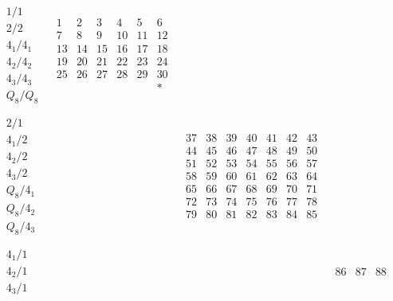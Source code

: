 \documentclass[11pt,a4paper]{amsart}
\begin{document}
\begin{align*}
  \begin{array}{r||c|c|c|c|c}
    \begin{array}{r}
      1/1 \\
      2/2 \\
      4_1/4_1 \\
      4_2/4_2 \\
      4_3/4_3 \\
      Q_8/Q_8 \\
    \end{array}
&
  \begin{array}{cccccc}
1&2&3&4&5&6\\
7&8&9&10&11&12\\
13&14&15&16&17&18\\
19&20&21&22&23&24\\
25&26&27&28&29&30\\
&&&&&*\\
  \end{array}
&&&& \\ \hline
    \begin{array}{r}
      2/1 \\
      4_1/2 \\
      4_2/2 \\
      4_3/2 \\
      Q_8/4_1 \\
      Q_8/4_2 \\
      Q_8/4_3 \\
    \end{array}
&&
   \begin{array}{cccccccc}
37&38&39&40&41&42&43\\
44&45&46&47&48&49&50\\
51&52&53&54&55&56&57\\
58&59&60&61&62&63&64\\
65&66&67&68&69&70&71\\
72&73&74&75&76&77&78\\
79&80&81&82&83&84&85\\
   \end{array}
&&& \\ \hline
    \begin{array}{r}
      4_1/1 \\
      4_2/1 \\
      4_3/1 \\
    \end{array}
&&&
    \begin{array}{ccc}
      86&87&88\\

\end{array}
\end{array}
\end{align*}
\end{document}
